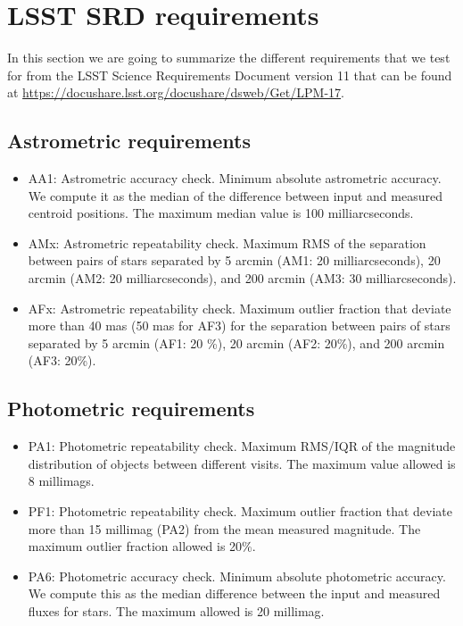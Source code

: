 \documentclass[\docopts]{\docclass}
\begin{document}
\section{LSST SRD requirements}
\label{app:lsst_srd}
In this section we are going to summarize the different requirements that we test for from the LSST Science Requirements Document version 11 that can be found at \url{https://docushare.lsst.org/docushare/dsweb/Get/LPM-17}.


\subsection{Astrometric requirements}
\begin{itemize}
\item AA1: Astrometric accuracy check. Minimum absolute astrometric accuracy. We compute it as the median of the difference between input and measured centroid positions. The maximum median value is 100 milliarcseconds.
\item AMx: Astrometric repeatability check. Maximum RMS of the separation between pairs of stars separated by 5 arcmin (AM1: 20 milliarcseconds), 20 arcmin (AM2: 20 milliarcseconds), and 200 arcmin (AM3: 30 milliarcseconds). 
\item AFx: Astrometric repeatability check. Maximum outlier fraction that deviate more than 40 mas (50 mas for AF3) for the separation between pairs of stars separated by 5 arcmin (AF1: 20 \%), 20 arcmin (AF2: 20\%), and 200 arcmin (AF3: 20\%).
\end{itemize} 

\subsection{Photometric requirements}
\begin{itemize}
\item PA1: Photometric repeatability check. Maximum RMS/IQR of the magnitude distribution of objects between different visits. The maximum value allowed is 8 millimags.
\item PF1: Photometric repeatability check. Maximum outlier fraction that deviate more than 15 millimag (PA2) from the mean measured magnitude. The maximum outlier fraction allowed is 20\%. 
\item PA6: Photometric accuracy check. Minimum absolute photometric accuracy. We compute this as the median difference between the input and measured fluxes for stars. The maximum allowed is 20 millimag.
\end{itemize}
\end{document}
